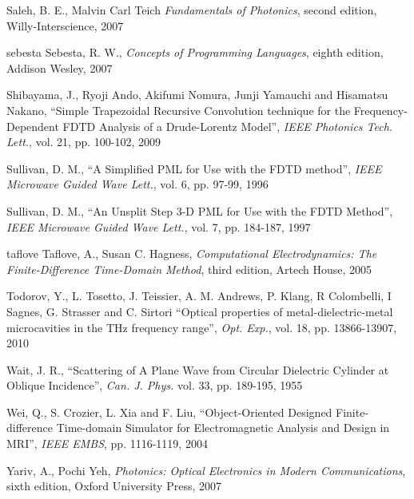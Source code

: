 \begin{thebibliography}{999}
  \bibitem
  {}
  Saleh, B. E., Malvin Carl Teich
  \textit{Fundamentals of Photonics}, second edition,
  Willy-Interscience,
  2007

  \bibitem
  {sebesta}
  Sebesta, R. W.,
  \textit{Concepts of Programming Languages}, eighth edition,
  Addison Wesley,
  2007

  \bibitem
  {}  
  Shibayama, J., Ryoji Ando, Akifumi Nomura, Junji Yamauchi and Hisamatsu Nakano,
  ``Simple Trapezoidal Recursive Convolution technique for the Frequency-Dependent FDTD Analysis of a Drude-Lorentz Model'',
  \textit{IEEE Photonics Tech. Lett.},
  vol. 21,
  pp. 100-102,
  2009

  \bibitem
  {}
  Sullivan, D. M.,
  ``A Simplified PML for Use with the FDTD method'',
  \textit{IEEE Microwave Guided Wave Lett.},
  vol. 6,
  pp. 97-99,
  1996

  \bibitem
  {}
  Sullivan, D. M.,
  ``An Unsplit Step 3-D PML for Use with the FDTD Method'',
  \textit{IEEE Microwave Guided Wave Lett.}, 
  vol. 7,
  pp. 184-187,
  1997

  \bibitem
  {taflove}
  Taflove, A., Susan C. Hagness, 
  \textit{Computational Electrodynamics: The Finite-Difference Time-Domain Method}, third edition,
  Artech House,
  2005

  \bibitem
  {}
  Todorov, Y., L. Tosetto, J. Teissier, A. M. Andrews, P. Klang, R Colombelli, I Sagnes, G. Strasser and C. Sirtori
  ``Optical properties of metal-dielectric-metal microcavities in the THz frequency range'',
  \textit{Opt. Exp.},
  vol. 18,
  pp. 13866-13907,
  2010

  \bibitem
  {}
  Wait, J. R.,
  ``Scattering of A Plane Wave from Circular Dielectric Cylinder at Oblique Incidence'',
  \textit{Can. J. Phys.}
  vol. 33,
  pp. 189-195,
  1955

  \bibitem
  {}
  Wei, Q., S. Crozier, L. Xia and F. Liu,
  ``Object-Oriented Designed Finite-difference Time-domain Simulator for Electromagnetic Analysis and Design in MRI'',
  \textit{IEEE EMBS},
  pp. 1116-1119,
  2004

  \bibitem
  {}
  Yariv, A., Pochi Yeh,
  \textit{Photonics: Optical Electronics in Modern Communications}, sixth edition,
  Oxford University Press, 
  2007

\end{thebibliography}
